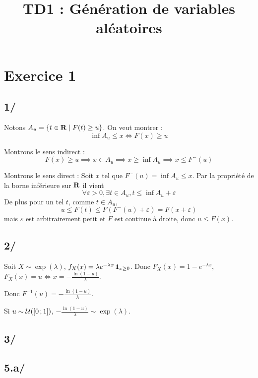 \documentclass[a4paper,9pt]{article}
\title{\vspace{-1.2cm} \textbf{TD1 : Génération de variables aléatoires}}
\begin{document}
\maketitle

\vspace{-1.5cm}

\section*{Exercice 1}

	\subsection{1/}
	
		Notons $A_u = \{ t \in \mathbf{R} \mid F(t) \geq u \}$.
		On veut montrer :
		$$\inf A_u \leq x
		\iff F(x) \geq u$$
		
		Montrons le sens indirect :
		$$F(x) \geq u \implies x \in A_u \implies x \geq \inf A_u \implies x \leq F^-(u)$$
		
		Montrons le sens direct :
		Soit $x$ tel que $F^-(u) = \inf A_u \leq x$.
		Par la propriété de la borne inférieure sur $\mathbf{R}$ il vient
		$$\forall \varepsilon > 0, \exists t \in A_u, t \leq \inf A_u + \varepsilon$$
		De plus pour un tel $t$, comme $t \in A_u$,
		$$u \leq F(t) \leq F( F^-(u) + \varepsilon) = F(x + \varepsilon)$$
		mais $\varepsilon$ est arbitrairement petit et $F$ est continue à droite, donc $u \leq F(x)$.
		
	\subsection{2/}
	
		Soit $X \sim \exp(\lambda)$, $f_X(x) = \lambda e^{-\lambda x} \operatorname{\mathbf{1}}_{x \geq 0}$.
		Donc $F_X(x) = 1 - e^{-\lambda x}$, $F_X(x) = u \iff x = - \frac{\ln(1 - u)}{\lambda}$.
		
		Donc $F^{-1}(u) = - \frac{\ln(1 - u)}{\lambda}$.
		
		Si $u \sim \mathcal{U}(\mathopen{[}0\mathclose{}\mathpunct{};1\mathclose{]})$, $- \frac{\ln(1 - u)}{\lambda} \sim \exp(\lambda)$.

	\subsection{3/}
	
	\subsection{5.a/}
	
\end{document}
